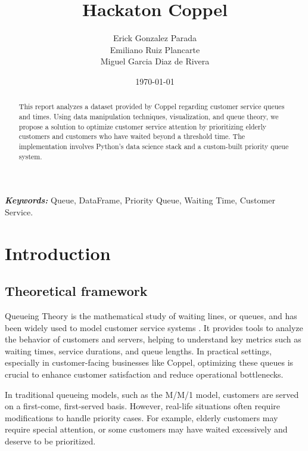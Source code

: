 \documentclass[twoside]{article}
\begin{document}
\title{Hackaton Coppel}
\author{\small{Erick Gonzalez Parada}\\
  \small{Emiliano Ruiz Plancarte} \\
\small{Miguel Garcia Diaz de Rivera}}
\date{\today}
\maketitle

\begin{abstract}
  \raggedright
  This report analyzes a dataset provided by Coppel regarding customer service queues and times. Using data manipulation techniques, visualization, and queue theory, we propose a solution to optimize customer service attention by prioritizing elderly customers and customers who have waited beyond a threshold time. The implementation involves Python's data science stack and a custom-built priority queue system.
\end{abstract}

\begin{justify}
  \textbf{\textit{Keywords:}} Queue, DataFrame, Priority Queue, Waiting Time, Customer Service.
\end{justify}

\section{Introduction}
\subsection*{Theoretical framework}

Queueing Theory is the mathematical study of waiting lines, or queues, and has been widely used to model customer service systems \cite{queueingTheory}. It provides tools to analyze the behavior of customers and servers, helping to understand key metrics such as waiting times, service durations, and queue lengths. In practical settings, especially in customer-facing businesses like Coppel, optimizing these queues is crucial to enhance customer satisfaction and reduce operational bottlenecks.

In traditional queueing models, such as the M/M/1 model, customers are served on a first-come, first-served basis. However, real-life situations often require modifications to handle priority cases. For example, elderly customers may require special attention, or some customers may have waited excessively and deserve to be prioritized.
\end{document}
